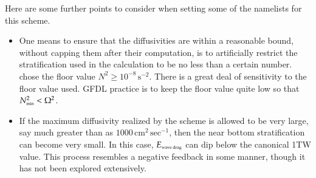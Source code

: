 Here are some further points to consider when setting some of the
namelists for this scheme.
\begin{itemize}

\item One means to ensure that the diffusivities are within a
  reasonable bound, without capping them after their computation, is
  to artificially restrict the stratification used in the calculation
  to be no less than a certain number.  \cite{Simmonsetal2004} chose
  the floor value $N^{2} \ge 10^{-8} \, \mbox{s}^{-2}$.  There is a
  great deal of sensitivity to the floor value used.  GFDL practice is
  to keep the floor value quite low so that $N^{2}_{\mbox{\tiny min}}
  < \Omega^{2}$.

\item If the maximum diffusivity realized by the scheme is allowed to
  be very large, say much greater than as $1000 \, \mbox{cm}^{2} \,
  \mbox{sec}^{-1}$, then the near bottom stratification can become
  very small.  In this case, $E_{\mbox{\tiny wave drag}}$ can dip
  below the canonical 1TW value.  This process resembles a negative
  feedback in some manner, though it has not been explored
  extensively.

\end{itemize}



